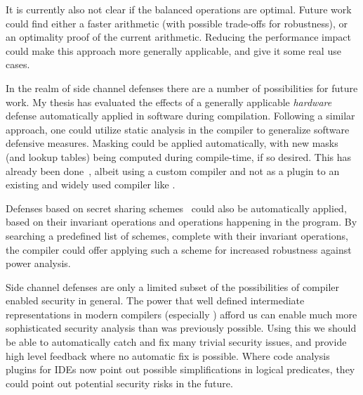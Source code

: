 It is currently also not clear if the balanced operations are optimal.
Future work could find either a faster arithmetic (with possible trade-offs for robustness), or an optimality proof of the current arithmetic.
Reducing the performance impact could make this approach more generally applicable, and give it some real use cases.

In the realm of side channel defenses there are a number of possibilities for future work.
My thesis has evaluated the effects of a generally applicable \emph{hardware} defense automatically applied in software during compilation.
Following a similar approach, one could utilize static analysis in the compiler to generalize software defensive measures.
Masking could be applied automatically, with new masks (and lookup tables) being computed during compile-time, if so desired.
This has already been done~\cite{moss2012compiler}, albeit using a custom compiler and not as a plugin to an existing and widely used compiler like \llvm{}.

Defenses based on secret sharing schemes~\cite{goubin2011protecting} could also be automatically applied, based on their invariant operations and operations happening in the program.
By searching a predefined list of schemes, complete with their invariant operations, the compiler could offer applying such a scheme for increased robustness against power analysis.

Side channel defenses are only a limited subset of the possibilities of compiler enabled security in general.
The power that well defined intermediate representations in modern compilers (especially \ir{}) afford us can enable much more sophisticated security analysis than was previously possible.
Using this we should be able to automatically catch and fix many trivial security issues, and provide high level feedback where no automatic fix is possible.
Where code analysis plugins for IDEs now point out possible simplifications in logical predicates, they could point out potential security risks in the future.
